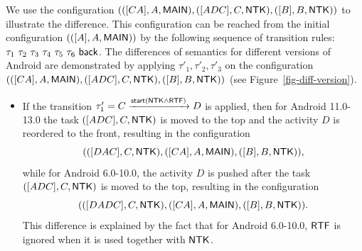 \begin{example}
We use the configuration $(([CA],A,{\sf MAIN}),([ADC],C,{\sf NTK}),([B],B,{\sf NTK}))$ to illustrate the difference. This configuration can be reached from the initial configuration $(([A],A,{\sf MAIN}))$ by the following sequence of transition rules: $\tau_1\ \tau_2\ \tau_3\ \tau_4\ \tau_5\ \tau_6\ \back$.
The differences of semantics for different versions of Android are demonstrated by applying $\tau'_1, \tau'_2, \tau'_3$ on the configuration $(([CA],A,{\sf MAIN}),([ADC],C,{\sf NTK}),([B],B,{\sf NTK}))$ (see Figure~\ref{fig-diff-version}).     
\begin{itemize}
 \item If the transition $\tau'_1 = C\xrightarrow{{\mathsf{start} }({\sf NTK} \wedge {\sf RTF})}D$ is applied, then for Android 11.0-13.0 the task $([ADC],C,{\sf NTK})$ is moved to the top and the activity $D$ is reordered to the front, resulting in the configuration
        $$(([DAC],C,{\sf NTK}), ([CA],A,{\sf MAIN}), ([B],B,{\sf NTK})),$$ 
        while for Android 6.0-10.0,  the activity $D$ is pushed after the task $([ADC],C,{\sf NTK})$ is moved to the top, resulting in the configuration 
        $$(([DADC],C,{\sf NTK}), ([CA],A,{\sf MAIN}), ([B],B,{\sf NTK})).$$
        This difference is explained by the fact that for Android 6.0-10.0, ${\sf RTF}$ is ignored when it is used together with ${\sf NTK}$.
        

\end{itemize}
\end{example}
